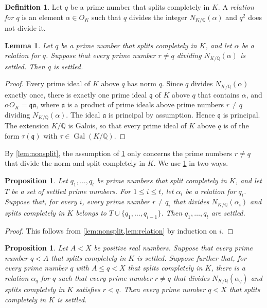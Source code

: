\documentclass[11pt]{amsart}
\theoremstyle{plain}
\newtheorem{proposition}[theorem]{Proposition}
\newtheorem{lemma}[theorem]{Lemma}
\theoremstyle{definition}
\newtheorem{definition}[theorem]{Definition}
\begin{document}
\begin{definition} \label{def:relation}
Let $q$ be a prime number that splits completely in $K$.
A \emph{relation for $q$} is an element $\alpha \in O_K$ such that $q$ divides the integer $N_{K/\mathbb{Q}}(\alpha)$ and $q^2$ does not divide it.
\end{definition}

\begin{lemma} \label{lem:relation}
Let $q$ be a prime number that splits completely in $K$, and let $\alpha$ be a relation for $q$.
Suppose that every prime number $r \ne q$ dividing $N_{K/\mathbb{Q}}(\alpha)$ is settled.
Then $q$ is settled.
\end{lemma}

\begin{proof}
Every prime ideal of $K$ above $q$ has norm $q$.
Since $q$ divides $N_{K/\mathbb{Q}}(\alpha)$ exactly once, there is exactly one prime ideal $\mathfrak{q}$ of $K$ above $q$ that contains $\alpha$, and $\alpha O_K = \mathfrak{q} \mathfrak{a}$, where $\mathfrak{a}$ is a product of prime ideals above prime numbers $r \ne q$ dividing $N_{K/\mathbb{Q}}(\alpha)$.
The ideal $\mathfrak{a}$ is principal by assumption.
Hence $\mathfrak{q}$ is principal.
The extension $K/\mathbb{Q}$ is Galois, so that every prime ideal of $K$ above $q$ is of the form $\tau(\mathfrak{q})$ with $\tau \in \operatorname{Gal}(K/\mathbb{Q})$.
\end{proof}

By \cref{lem:nonsplit}, the assumption of \cref{lem:relation} only concerns the prime numbers $r \ne q$ that divide the norm and split completely in $K$.
We use \cref{lem:relation} in two ways.

\begin{proposition} \label{prop:list}
Let $q_1, \ldots, q_t$ be prime numbers that split completely in $K$, and let $T$ be a set of settled prime numbers.
For $1 \le i \le t$, let $\alpha_i$ be a relation for $q_i$.
Suppose that, for every $i$, every prime number $r \ne q_i$ that divides $N_{K/\mathbb{Q}}(\alpha_i)$ and splits completely in $K$ belongs to $T \cup \{q_1, \ldots, q_{i-1}\}$.
Then $q_1, \ldots, q_t$ are settled.
\end{proposition}

\begin{proof}
This follows from \cref{lem:nonsplit,lem:relation} by induction on $i$.
\end{proof}

\begin{proposition} \label{prop:range}
Let $A < X$ be positive real numbers.
Suppose that every prime number $q < A$ that splits completely in $K$ is settled.
Suppose further that, for every prime number $q$ with $A \le q < X$ that splits completely in $K$, there is a relation $\alpha_q$ for $q$ such that every prime number $r \ne q$ that divides $N_{K/\mathbb{Q}}(\alpha_q)$ and splits completely in $K$ satisfies $r < q$.
Then every prime number $q < X$ that splits completely in $K$ is settled.
\end{proposition}
\end{document}
